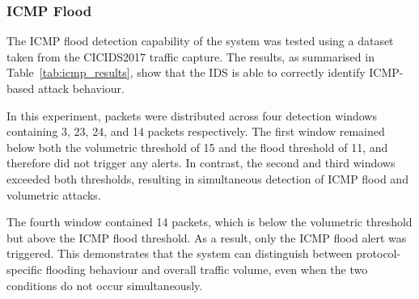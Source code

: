 \subsubsection{ICMP Flood}

\begin{table}[H]
    \centering
    \caption{ICMP flood detection results using CICIDS2017 dataset}
    \label{tab:icmp_results}
\end{table}

The ICMP flood detection capability of the system was tested using a dataset
taken from the CICIDS2017 traffic capture. The results, as summarised in
Table~\ref{tab:icmp_results}, show that the IDS is able to correctly
identify ICMP-based attack behaviour.

In this experiment, packets were distributed across four detection windows
containing 3, 23, 24, and 14 packets respectively. The first window remained
below both the volumetric threshold of 15 and the flood threshold of 11, and
therefore did not trigger any alerts. In contrast, the second and third windows
exceeded both thresholds, resulting in simultaneous detection of ICMP flood and
volumetric attacks.

The fourth window contained 14 packets, which is below the volumetric threshold
but above the ICMP flood threshold. As a result, only the ICMP flood alert was
triggered. This demonstrates that the system can distinguish between
protocol-specific flooding behaviour and overall traffic volume, even when the
two conditions do not occur simultaneously.

